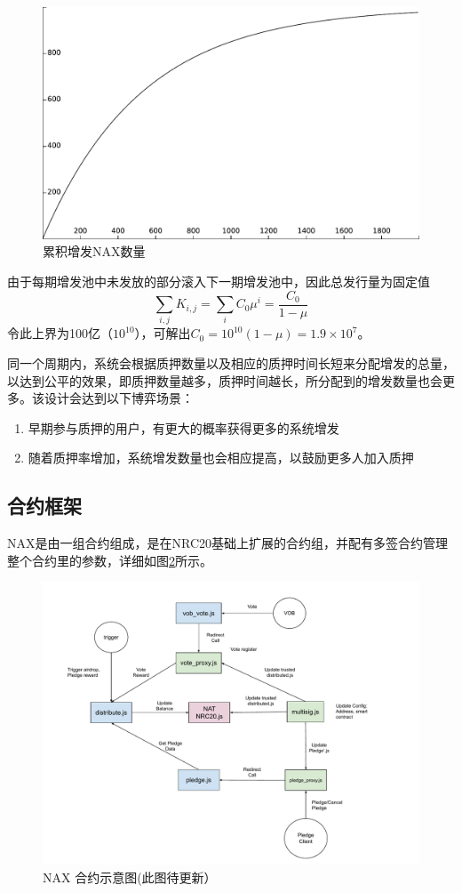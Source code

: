  \begin{figure}
   \centering
   \includegraphics[scale=0.4]{../common/ch/acc.pdf}
   \caption{累积增发NAX数量}\label{acc}
 \end{figure}

由于每期增发池中未发放的部分滚入下一期增发池中，因此总发行量为固定值
\begin{equation}
  \sum_{i,j} K_{i,j} = \sum_i C_0 \mu^i = \frac{C_0}{1-\mu}
\end{equation}
令此上界为100亿（\(10^{10}\)），可解出\(C_0 = 10^{10}(1-\mu) = 1.9\times10^7\)。


同一个周期内，系统会根据质押数量以及相应的质押时间长短来分配增发的总量，以达到公平的效果，即质押数量越多，质押时间越长，所分配到的增发数量也会更多。该设计会达到以下博弈场景：
\begin{enumerate}
  \item 早期参与质押的用户，有更大的概率获得更多的系统增发
  \item 随着质押率增加，系统增发数量也会相应提高，以鼓励更多人加入质押
\end{enumerate}

\subsection{合约框架}
NAX是由一组合约组成，是在NRC20基础上扩展的合约组，并配有多签合约管理整个合约里的参数，详细如图\ref{fig:nax_framework}所示。

\begin{figure}[htbp]
  \centering
    \includegraphics[width=1\textwidth]{../common/ch/nax.pdf}
    \caption{NAX 合约示意图(此图待更新） \label{fig:nax_framework}}
\end{figure}
